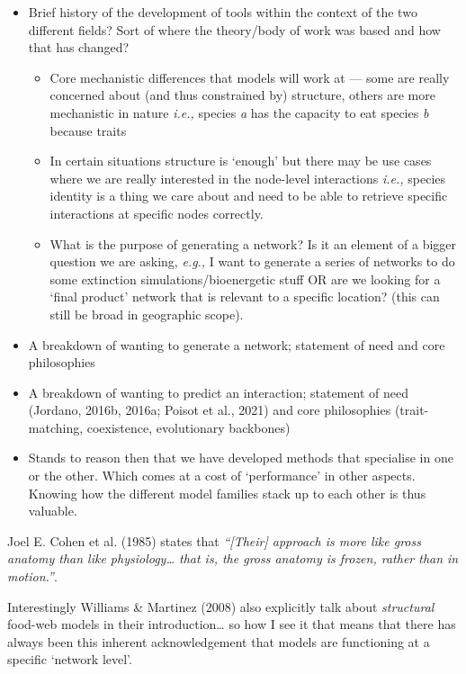 \documentclass[
]{agujournal2019}
\begin{document}
\begin{itemize}
\item
  Brief history of the development of tools within the context of the
  two different fields? Sort of where the theory/body of work was based
  and how that has changed?

  \begin{itemize}
  \item
    Core mechanistic differences that models will work at --- some are
    really concerned about (and thus constrained by) structure, others
    are more mechanistic in nature \emph{i.e.,} species \emph{a} has the
    capacity to eat species \emph{b} because traits
  \item
    In certain situations structure is `enough' but there may be use
    cases where we are really interested in the node-level interactions
    \emph{i.e.,} species identity is a thing we care about and need to
    be able to retrieve specific interactions at specific nodes
    correctly.
  \item
    What is the purpose of generating a network? Is it an element of a
    bigger question we are asking, \emph{e.g.,} I want to generate a
    series of networks to do some extinction simulations/bioenergetic
    stuff OR are we looking for a `final product' network that is
    relevant to a specific location? (this can still be broad in
    geographic scope).
  \end{itemize}
\item
  A breakdown of wanting to generate a network; statement of need and
  core philosophies
\item
  A breakdown of wanting to predict an interaction; statement of need
  (Jordano, 2016b, 2016a; Poisot et al., 2021) and core philosophies
  (trait-matching, coexistence, evolutionary backbones)
\item
  Stands to reason then that we have developed methods that specialise
  in one or the other. Which comes at a cost of `performance' in other
  aspects. Knowing how the different model families stack up to each
  other is thus valuable.
\end{itemize}

Joel E. Cohen et al. (1985) states that \emph{``{[}Their{]} approach is
more like gross anatomy than like physiology\ldots{} that is, the gross
anatomy is frozen, rather than in motion.''}.

Interestingly Williams \& Martinez (2008) also explicitly talk about
\emph{structural} food-web models in their introduction\ldots{} so how I
see it that means that there has always been this inherent
acknowledgement that models are functioning at a specific `network
level'.
\end{document}
